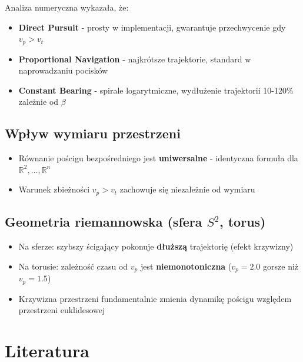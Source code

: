 \documentclass[12pt,a4paper]{article}
\begin{document}
Analiza numeryczna wykazała, że:
\begin{itemize}
    \item \textbf{Direct Pursuit} - prosty w implementacji, gwarantuje przechwycenie gdy $v_p > v_t$
    \item \textbf{Proportional Navigation} - najkrótsze trajektorie, standard w naprowadzaniu pocisków
    \item \textbf{Constant Bearing} - spirale logarytmiczne, wydłużenie trajektorii 10-120\% zależnie od $\beta$
\end{itemize}

\subsection{Wpływ wymiaru przestrzeni}

\begin{itemize}
    \item Równanie pościgu bezpośredniego jest \textbf{uniwersalne} - identyczna formuła dla $\mathbb{R}^2, \ldots, \mathbb{R}^n$
    \item Warunek zbieżności $v_p > v_t$ zachowuje się niezależnie od wymiaru
\end{itemize}

\subsection{Geometria riemannowska (sfera $S^2$, torus)}

\begin{itemize}
    \item Na sferze: szybszy ścigający pokonuje \textbf{dłuższą} trajektorię (efekt krzywizny)
    \item Na torusie: zależność czasu od $v_p$ jest \textbf{niemonotoniczna} ($v_p = 2.0$ gorsze niż $v_p = 1.5$)
    \item Krzywizna przestrzeni fundamentalnie zmienia dynamikę pościgu względem przestrzeni euklidesowej
\end{itemize}

\section*{Literatura}
\end{document}

